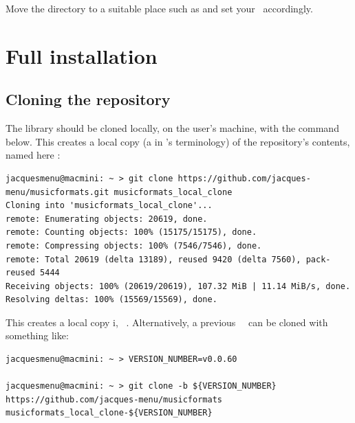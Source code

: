 Move the  directory to a suitable place such as  and set your  \environmentVariable\ accordingly.


\chapter{Full installation}

\section{Cloning the repository}

The library should be cloned locally, on the user's machine, with the command below. This creates a local copy (a  in \git's terminology) of the repository's contents, named here :
\begin{lstlisting}[language=Terminal]
jacquesmenu@macmini: ~ > git clone https://github.com/jacques-menu/musicformats.git musicformats_local_clone
Cloning into 'musicformats_local_clone'...
remote: Enumerating objects: 20619, done.
remote: Counting objects: 100% (15175/15175), done.
remote: Compressing objects: 100% (7546/7546), done.
remote: Total 20619 (delta 13189), reused 9420 (delta 7560), pack-reused 5444
Receiving objects: 100% (20619/20619), 107.32 MiB | 11.14 MiB/s, done.
Resolving deltas: 100% (15569/15569), done.
\end{lstlisting}

This creates a local copy i, \master\ \branch.
Alternatively, a previous \mf\ \version\ can be cloned with something like:
\begin{lstlisting}[language=Terminal]
jacquesmenu@macmini: ~ > VERSION_NUMBER=v0.0.60

jacquesmenu@macmini: ~ > git clone -b ${VERSION_NUMBER} https://github.com/jacques-menu/musicformats musicformats_local_clone-${VERSION_NUMBER}
\end{lstlisting}


